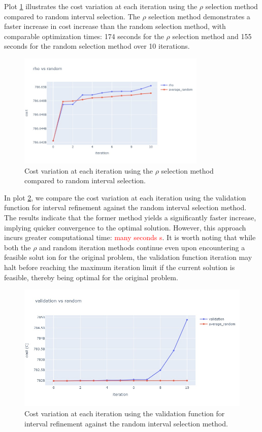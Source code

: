 Plot \ref{fig:rho_vs_average} illustrates the cost variation at each iteration using the \(\rho\) selection method compared to random interval selection.
 The \(\rho\) selection method demonstrates a faster increase in cost increase than the random selection method, with comparable optimization times: 174 seconds for the \(\rho\) selection method 
 and 155 seconds for the random selection method over 10 iterations.
\begin{figure}[htbp]
  \centering
  \includegraphics[width=0.8\textwidth]{images/rho_vas_average2.png}
  \caption{Cost variation at each iteration using the \(\rho\) selection method compared to random interval selection.}
  \label{fig:rho_vs_average}
\end{figure}
In plot \ref{fig:val_vs_average}, we compare the cost variation at each iteration using the validation function for interval refinement against the random interval selection method. 
The results indicate that the former method yields a significantly faster increase, implying quicker convergence to the optimal solution. However, this approach incurs greater computational time: \textcolor{red}{many seconds s}. It is worth noting that while both the \(\rho\) and random iteration methods continue even upon encountering a feasible solut
ion for the original problem, the validation function iteration may halt before reaching the maximum iteration limit if the current solution is feasible, thereby being optimal for the original problem.
\begin{figure}[htbp]
  \centering
  \includegraphics[width=\textwidth]{images/val_vs_average2.png}
  \caption{Cost variation at each iteration using the validation function for interval refinement against the random interval selection method.}
  \label{fig:val_vs_average}
\end{figure}


